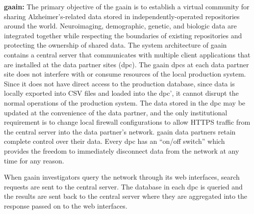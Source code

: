 \textbf{\gls{gaain}\cite{gaain}:}
The primary objective of the \gls{gaain}
is to establish a virtual community for sharing Alzheimer's-related data stored in
independently-operated repositories around the world.
Neuroimaging, demographic, genetic, and biologic data are integrated together while
respecting the boundaries of existing repositories and protecting the ownership of
shared data.
The system architecture of \gls{gaain} contains a central server that communicates with
multiple client applications that are installed at the data partner sites (\gls{dpc}).
The \gls{gaain} \gls{dpc}s at each data partner site does not interfere with or consume
resources of the local production system.
Since it does not have direct access to the production database, since data is locally
exported into CSV files and loaded into the \gls{dpc}', it cannot disrupt
the normal operations of the production system.
The data stored in the \gls{dpc} may be updated at the convenience of the data partner,
and the only institutional requirement is to change local firewall configurations to
allow HTTPS traffic from the central server into the data partner's network.
\gls{gaain} data partners retain complete control over their data.
Every \gls{dpc} has an “on/off switch” which provides the freedom to immediately
disconnect data from the network at any time for any reason.

When \gls{gaain} investigators query the network through its web interfaces, search
requests are sent to the central server.
The database in each \gls{dpc} is queried and the results are sent back to the
central server where they are aggregated into the response passed on to the web
interfaces.




